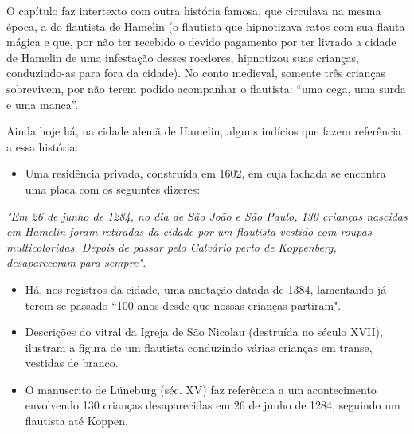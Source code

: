 \documentclass[12pt]{extarticle}
\begin{document}
O capítulo faz intertexto com outra história famosa, que circulava na
mesma época, a do flautista de Hamelin (o flautista que hipnotizava
ratos com sua flauta mágica e que, por não ter recebido o devido
pagamento por ter livrado a cidade de Hamelin de uma infestação desses
roedores, hipnotizou suas crianças, conduzindo-as para fora da cidade).
No conto medieval, somente três crianças sobrevivem, por não terem
podido acompanhar o flautista: ``uma cega, uma surda e uma manca''.




Ainda hoje há, na cidade alemã de Hamelin, alguns indícios que fazem
referência a essa história:

\begin{itemize}
\item
  Uma residência privada, construída em 1602, em cuja fachada se
  encontra uma placa com os seguintes dizeres:
\end{itemize}

\emph{"Em 26 de junho de 1284, no dia de São João e São Paulo, 130
crianças nascidas em Hamelin foram retiradas da cidade por um flautista
vestido com roupas multicoloridas. Depois de passar pelo Calvário perto
de Koppenberg, desapareceram para sempre".}



\begin{itemize}
\item
  Há, nos registros da cidade, uma anotação datada de 1384, lamentando
  já terem se passado ``100 anos desde que nossas crianças partiram".
\end{itemize}

\begin{quote}

\end{quote}

\begin{itemize}
\item
  Descrições do vitral da Igreja de São Nicolau (destruída no século
  XVII), ilustram a figura de um flautista conduzindo várias crianças em
  transe, vestidas de branco.
\end{itemize}

\begin{itemize}
\item
  O manuscrito de Lüneburg (séc. XV) faz referência a um acontecimento
  envolvendo 130 crianças desaparecidas em 26 de junho de 1284, seguindo
  um flautista até Koppen.
\end{itemize}
\end{document}
